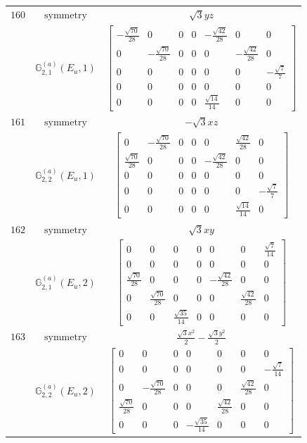 \documentclass[fleqn,8pt,landscape]{jsarticle}
\begin{document}
\begin{longtable}{ccc}
$ 160 $ & $ \text{symmetry} $ & $ \sqrt{3} y z $ \\
$  $ & $ \mathbb{G}_{2,1}^{(a)}(E_{u},1) $ & $ \begin{bmatrix} - \frac{\sqrt{70}}{28} & 0 & 0 & 0 & - \frac{\sqrt{42}}{28} & 0 & 0 \\ 0 & - \frac{\sqrt{70}}{28} & 0 & 0 & 0 & - \frac{\sqrt{42}}{28} & 0 \\ 0 & 0 & 0 & 0 & 0 & 0 & - \frac{\sqrt{7}}{7} \\ 0 & 0 & 0 & 0 & 0 & 0 & 0 \\ 0 & 0 & 0 & 0 & \frac{\sqrt{14}}{14} & 0 & 0 \end{bmatrix} $ \\ \hline
$ 161 $ & $ \text{symmetry} $ & $ - \sqrt{3} x z $ \\
$  $ & $ \mathbb{G}_{2,2}^{(a)}(E_{u},1) $ & $ \begin{bmatrix} 0 & - \frac{\sqrt{70}}{28} & 0 & 0 & 0 & \frac{\sqrt{42}}{28} & 0 \\ \frac{\sqrt{70}}{28} & 0 & 0 & 0 & - \frac{\sqrt{42}}{28} & 0 & 0 \\ 0 & 0 & 0 & 0 & 0 & 0 & 0 \\ 0 & 0 & 0 & 0 & 0 & 0 & - \frac{\sqrt{7}}{7} \\ 0 & 0 & 0 & 0 & 0 & \frac{\sqrt{14}}{14} & 0 \end{bmatrix} $ \\ \hline
$ 162 $ & $ \text{symmetry} $ & $ \sqrt{3} x y $ \\
$  $ & $ \mathbb{G}_{2,1}^{(a)}(E_{u},2) $ & $ \begin{bmatrix} 0 & 0 & 0 & 0 & 0 & 0 & \frac{\sqrt{7}}{14} \\ 0 & 0 & 0 & 0 & 0 & 0 & 0 \\ \frac{\sqrt{70}}{28} & 0 & 0 & 0 & - \frac{\sqrt{42}}{28} & 0 & 0 \\ 0 & \frac{\sqrt{70}}{28} & 0 & 0 & 0 & \frac{\sqrt{42}}{28} & 0 \\ 0 & 0 & \frac{\sqrt{35}}{14} & 0 & 0 & 0 & 0 \end{bmatrix} $ \\ \hline
$ 163 $ & $ \text{symmetry} $ & $ \frac{\sqrt{3} x^{2}}{2} - \frac{\sqrt{3} y^{2}}{2} $ \\
$  $ & $ \mathbb{G}_{2,2}^{(a)}(E_{u},2) $ & $ \begin{bmatrix} 0 & 0 & 0 & 0 & 0 & 0 & 0 \\ 0 & 0 & 0 & 0 & 0 & 0 & - \frac{\sqrt{7}}{14} \\ 0 & - \frac{\sqrt{70}}{28} & 0 & 0 & 0 & \frac{\sqrt{42}}{28} & 0 \\ \frac{\sqrt{70}}{28} & 0 & 0 & 0 & \frac{\sqrt{42}}{28} & 0 & 0 \\ 0 & 0 & 0 & - \frac{\sqrt{35}}{14} & 0 & 0 & 0 \end{bmatrix} $ \\ \hline

\end{longtable}
\end{document}
